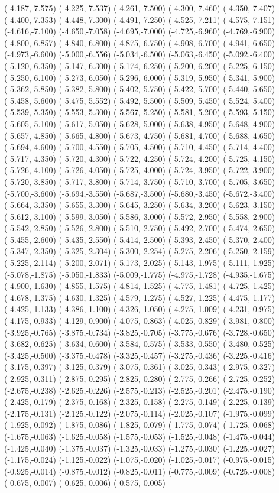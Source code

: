 (-4.187,-7.575) (-4.225,-7.537) (-4.261,-7.500) (-4.300,-7.460) (-4.350,-7.407) (-4.400,-7.353) (-4.448,-7.300) (-4.491,-7.250) (-4.525,-7.211) (-4.575,-7.151) (-4.616,-7.100) (-4.650,-7.058) (-4.695,-7.000) (-4.725,-6.960) (-4.769,-6.900) (-4.800,-6.857) (-4.840,-6.800) (-4.875,-6.750) (-4.908,-6.700) (-4.941,-6.650) (-4.973,-6.600) (-5.000,-6.556) (-5.034,-6.500) (-5.063,-6.450) (-5.092,-6.400) (-5.120,-6.350) (-5.147,-6.300) (-5.174,-6.250) (-5.200,-6.200) (-5.225,-6.150) (-5.250,-6.100) (-5.273,-6.050) (-5.296,-6.000) (-5.319,-5.950) (-5.341,-5.900) (-5.362,-5.850) (-5.382,-5.800) (-5.402,-5.750) (-5.422,-5.700) (-5.440,-5.650) (-5.458,-5.600) (-5.475,-5.552) (-5.492,-5.500) (-5.509,-5.450) (-5.524,-5.400) (-5.539,-5.350) (-5.553,-5.300) (-5.567,-5.250) (-5.581,-5.200) (-5.593,-5.150) (-5.605,-5.100) (-5.617,-5.050) (-5.628,-5.000) (-5.638,-4.950) (-5.648,-4.900) (-5.657,-4.850) (-5.665,-4.800) (-5.673,-4.750) (-5.681,-4.700) (-5.688,-4.650) (-5.694,-4.600) (-5.700,-4.550) (-5.705,-4.500) (-5.710,-4.450) (-5.714,-4.400) (-5.717,-4.350) (-5.720,-4.300) (-5.722,-4.250) (-5.724,-4.200) (-5.725,-4.150) (-5.726,-4.100) (-5.726,-4.050) (-5.725,-4.000) (-5.724,-3.950) (-5.722,-3.900) (-5.720,-3.850) (-5.717,-3.800) (-5.714,-3.750) (-5.710,-3.700) (-5.705,-3.650) (-5.700,-3.600) (-5.694,-3.550) (-5.687,-3.500) (-5.680,-3.450) (-5.672,-3.400) (-5.664,-3.350) (-5.655,-3.300) (-5.645,-3.250) (-5.634,-3.200) (-5.623,-3.150) (-5.612,-3.100) (-5.599,-3.050) (-5.586,-3.000) (-5.572,-2.950) (-5.558,-2.900) (-5.542,-2.850) (-5.526,-2.800) (-5.510,-2.750) (-5.492,-2.700) (-5.474,-2.650) (-5.455,-2.600) (-5.435,-2.550) (-5.414,-2.500) (-5.393,-2.450) (-5.370,-2.400) (-5.347,-2.350) (-5.325,-2.304) (-5.300,-2.254) (-5.275,-2.206) (-5.250,-2.159) (-5.225,-2.114) (-5.200,-2.071) (-5.173,-2.025) (-5.143,-1.975) (-5.111,-1.925) (-5.078,-1.875) (-5.050,-1.833) (-5.009,-1.775) (-4.975,-1.728) (-4.935,-1.675) (-4.900,-1.630) (-4.855,-1.575) (-4.814,-1.525) (-4.775,-1.481) (-4.725,-1.425) (-4.678,-1.375) (-4.630,-1.325) (-4.579,-1.275) (-4.527,-1.225) (-4.475,-1.177) (-4.425,-1.133) (-4.386,-1.100) (-4.326,-1.050) (-4.275,-1.009) (-4.231,-0.975) (-4.175,-0.933) (-4.129,-0.900) (-4.075,-0.863) (-4.025,-0.829) (-3.981,-0.800) (-3.925,-0.765) (-3.875,-0.734) (-3.825,-0.705) (-3.775,-0.676) (-3.728,-0.650) (-3.682,-0.625) (-3.634,-0.600) (-3.584,-0.575) (-3.533,-0.550) (-3.480,-0.525) (-3.425,-0.500) (-3.375,-0.478) (-3.325,-0.457) (-3.275,-0.436) (-3.225,-0.416) (-3.175,-0.397) (-3.125,-0.379) (-3.075,-0.361) (-3.025,-0.343) (-2.975,-0.327) (-2.925,-0.311) (-2.875,-0.295) (-2.825,-0.280) (-2.775,-0.266) (-2.725,-0.252) (-2.675,-0.238) (-2.625,-0.226) (-2.575,-0.213) (-2.525,-0.201) (-2.475,-0.190) (-2.425,-0.179) (-2.375,-0.168) (-2.325,-0.158) (-2.275,-0.149) (-2.225,-0.139) (-2.175,-0.131) (-2.125,-0.122) (-2.075,-0.114) (-2.025,-0.107) (-1.975,-0.099) (-1.925,-0.092) (-1.875,-0.086) (-1.825,-0.079) (-1.775,-0.074) (-1.725,-0.068) (-1.675,-0.063) (-1.625,-0.058) (-1.575,-0.053) (-1.525,-0.048) (-1.475,-0.044) (-1.425,-0.040) (-1.375,-0.037) (-1.325,-0.033) (-1.275,-0.030) (-1.225,-0.027) (-1.175,-0.024) (-1.125,-0.022) (-1.075,-0.020) (-1.025,-0.017) (-0.975,-0.015) (-0.925,-0.014) (-0.875,-0.012) (-0.825,-0.011) (-0.775,-0.009) (-0.725,-0.008) (-0.675,-0.007) (-0.625,-0.006) (-0.575,-0.005) 